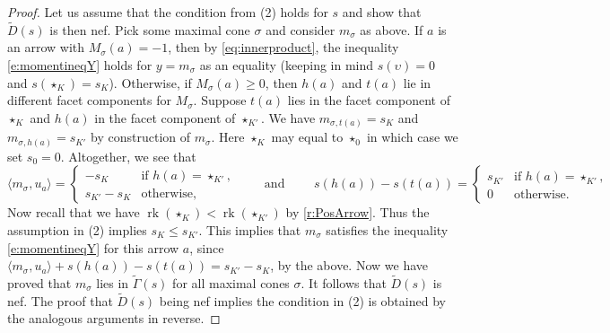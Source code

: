 \documentclass{amsart}
\theoremstyle{definition}
\numberwithin{equation}{section}
\newcommand{\vv}{\upsilon}
\newcommand{\rk}{\operatorname{rk}}
\begin{document}
\begin{proof}
	Let us assume that the condition from (2) holds for $s$ and show that $\widetilde D(s)$ is then nef. Pick some maximal cone $\sigma$ and consider  $m_\sigma$ as above. If $a$ is an arrow with  $M_\sigma(a)=-1$, then by \eqref{eq:innerproduct}, the inequality  \eqref{e:momentineqY} holds for $y=m_\sigma$ as an equality (keeping in mind $s(\vv)=0$ and $s(\star_K)=s_K$). Otherwise, if $M_\sigma(a)\ge 0$, then $h(a)$ and $t(a)$ lie in different facet components for $M_\sigma$. Suppose $t(a)$ lies in the facet component of $\star_K$ and $h(a)$ in the facet component of $\star_{K'}$.  We have $m_{\sigma,t(a)}=s_K$ 
	and $m_{\sigma,h(a)}=s_{K'}$ by construction of $m_\sigma$. Here $\star_K$ may equal to $\star_0$ in which case we set $s_0=0$. Altogether, we see that
\[
\langle m_\sigma,u_a\rangle=\begin{cases}-s_K&\text{if $h(a)=\star_{K'}$,}\\
s_{K'}-s_K&\text{otherwise,}\end{cases}\qquad\text{ and }\qquad
	s(h(a))-s(t(a))=\begin{cases}s_{K'}&\text{if $h(a)=\star_{K'}$,}\\
		0&\text{otherwise. }
\end{cases} 
\]
	Now recall that we have $\rk(\star_K)<\rk(\star_{K'})$ by \cref{r:PosArrow}. Thus  the assumption in (2) implies  $s_K\le s_{K'}$. This implies that $m_\sigma$ satisfies the inequality \eqref{e:momentineqY} for this arrow $a$, since $
\langle m_\sigma,u_a\rangle+s(h(a))-s(t(a))=s_{K'}-s_K$, by the above. Now we have proved that $m_\sigma$ lies in $\widetilde \Gamma(s)$ for all maximal cones $\sigma$. It follows that $\widetilde D(s)$ is nef. The proof that $\widetilde D(s)$ being nef implies the condition in (2) is obtained by the analogous arguments in reverse.  


\end{proof}
\end{document}

